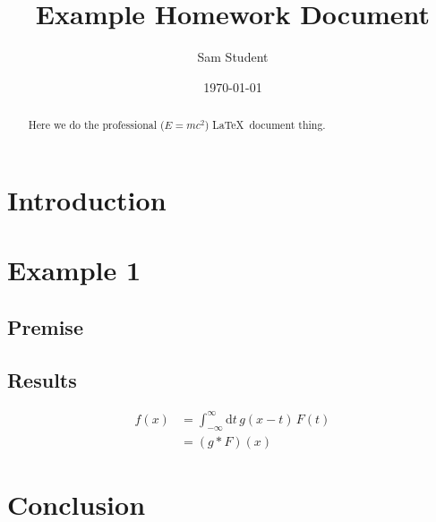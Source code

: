 \documentclass[aps,pra,12pt,amsmath,notitlepage,letterpaper]{revtex4-1}
\begin{document}
\title{Example Homework Document}
\author{Sam Student}
\date{\today}

\begin{abstract}
Here we do the professional ($E = m c^2$) \LaTeX~document thing.
\end{abstract}

\maketitle

\section{Introduction}
\Blindtext

\section{Example 1}
\blindmathtrue
\subsection{Premise}
\blindtext

\subsection{Results}
\begin{align}
  f(x) &= \int_{-\infty}^\infty \!\! \mathrm{d}t\, g(x - t)\,F(t) \\
       &= (g \ast F)(x) \nonumber
\end{align}
\Blindtext

\section{Conclusion}
\blindmathfalse

\blindtext
\end{document}

